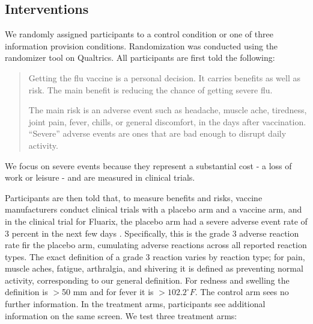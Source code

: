 \subsection{Interventions}
We randomly assigned participants to a control condition or one of three information provision 
conditions. Randomization was conducted using the randomizer tool on Qualtrics. 
All participants are first told the following:
\begin{quote}
Getting the flu vaccine is a personal decision. It carries benefits as well as risk. 
The main benefit is reducing the chance of getting severe flu. 

The main risk is an adverse event such as headache, muscle ache, tiredness, 
joint pain, fever, chills, or general discomfort, in the days after vaccination. 
“Severe” adverse events are ones that are bad enough to disrupt daily activity. 
\end{quote}
We focus on severe events because they represent a substantial cost - a loss of work or leisure
- and are measured in clinical trials. 

Participants are then told that, to measure benefits and risks, vaccine manufacturers 
conduct clinical trials with a placebo arm and a vaccine arm, and in the clinical trial 
for Fluarix,  the placebo arm had a severe adverse event rate of 3 percent in the next few 
days \citep{fda_fluzone_quadrivalent_package_insert}.  Specifically, this is the grade 3 adverse reaction rate fir the placebo arm, cumulating adverse reactions across
all reported reaction types. The exact definition of a grade 3 reaction varies by reaction type; 
for pain, muscle aches, fatigue, arthralgia, and shivering it is defined as preventing normal activity,
corresponding to our general definition. For redness and swelling the definition is $>$50 mm and 
for fever it is $>102.2^\circ F$. The control arm sees no further information. In the treatment arms, participants see 
additional information on the same screen. We test three treatment arms: 

